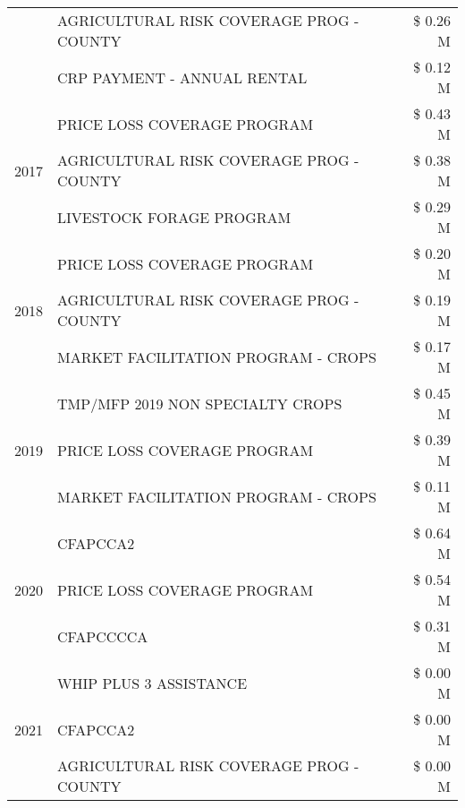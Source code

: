 \begin{tabular}{llr}
 & AGRICULTURAL RISK COVERAGE PROG - COUNTY      & \$ 0.26 M \\
 & CRP PAYMENT - ANNUAL RENTAL                   & \$ 0.12 M \\
\cline{1-3}
\multirow[t]{3}{*}{2017} & PRICE LOSS COVERAGE PROGRAM & \$ 0.43 M \\
 & AGRICULTURAL RISK COVERAGE PROG - COUNTY & \$ 0.38 M \\
 & LIVESTOCK FORAGE PROGRAM & \$ 0.29 M \\
\cline{1-3}
\multirow[t]{3}{*}{2018} & PRICE LOSS COVERAGE PROGRAM & \$ 0.20 M \\
 & AGRICULTURAL RISK COVERAGE PROG - COUNTY & \$ 0.19 M \\
 & MARKET FACILITATION PROGRAM - CROPS & \$ 0.17 M \\
\cline{1-3}
\multirow[t]{3}{*}{2019} & TMP/MFP 2019 NON SPECIALTY CROPS & \$ 0.45 M \\
 & PRICE LOSS COVERAGE PROGRAM & \$ 0.39 M \\
 & MARKET FACILITATION PROGRAM - CROPS & \$ 0.11 M \\
\cline{1-3}
\multirow[t]{3}{*}{2020} & CFAPCCA2 & \$ 0.64 M \\
 & PRICE LOSS COVERAGE PROGRAM & \$ 0.54 M \\
 & CFAPCCCCA & \$ 0.31 M \\
\cline{1-3}
\multirow[t]{3}{*}{2021} & WHIP PLUS 3 ASSISTANCE & \$ 0.00 M \\
 & CFAPCCA2 & \$ 0.00 M \\
 & AGRICULTURAL RISK COVERAGE PROG - COUNTY & \$ 0.00 M \\
\cline{1-3}
\bottomrule
\end{tabular}
